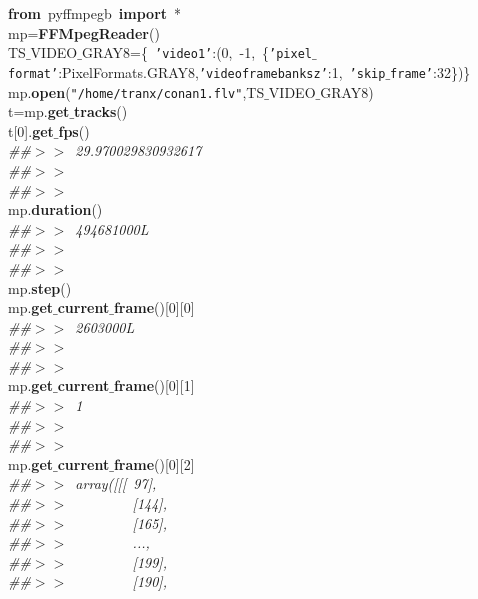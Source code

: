 \noindent
\mbox{}\textbf{from}\ pyffmpegb\ \textbf{import}\ * \\
\mbox{}mp=\textbf{FFMpegReader}() \\
\mbox{}TS$\_$VIDEO$\_$GRAY8=\{\ \texttt{'video1'}:(0,\ -1,\ \{\texttt{'pixel$\_$format'}:PixelFormats.GRAY8,\texttt{'videoframebanksz'}:1,\ \texttt{'skip$\_$frame'}:32\})\} \\
\mbox{}mp.\textbf{open}(\texttt{"{}/home/tranx/conan1.flv"{}},TS$\_$VIDEO$\_$GRAY8) \\
\mbox{}t=mp.\textbf{get$\_$tracks}() \\
\mbox{}t[0].\textbf{get$\_$fps}() \\
\mbox{}\textit{\#\#$>$$>$\ 29.970029830932617} \\
\mbox{}\textit{\#\#$>$$>$\ } \\
\mbox{}\textit{\#\#$>$$>$\ } \\
\mbox{}mp.\textbf{duration}() \\
\mbox{}\textit{\#\#$>$$>$\ 494681000L} \\
\mbox{}\textit{\#\#$>$$>$\ } \\
\mbox{}\textit{\#\#$>$$>$\ } \\
\mbox{}mp.\textbf{step}() \\
\mbox{}mp.\textbf{get$\_$current$\_$frame}()[0][0] \\
\mbox{}\textit{\#\#$>$$>$\ 2603000L} \\
\mbox{}\textit{\#\#$>$$>$\ } \\
\mbox{}\textit{\#\#$>$$>$\ } \\
\mbox{}mp.\textbf{get$\_$current$\_$frame}()[0][1] \\
\mbox{}\textit{\#\#$>$$>$\ 1} \\
\mbox{}\textit{\#\#$>$$>$\ } \\
\mbox{}\textit{\#\#$>$$>$\ } \\
\mbox{}mp.\textbf{get$\_$current$\_$frame}()[0][2] \\
\mbox{}\textit{\#\#$>$$>$\ array([[[\ 97],} \\
\mbox{}\textit{\#\#$>$$>$\ \ \ \ \ \ \ \ \ [144],} \\
\mbox{}\textit{\#\#$>$$>$\ \ \ \ \ \ \ \ \ [165],} \\
\mbox{}\textit{\#\#$>$$>$\ \ \ \ \ \ \ \ \ ...,\ } \\
\mbox{}\textit{\#\#$>$$>$\ \ \ \ \ \ \ \ \ [199],} \\
\mbox{}\textit{\#\#$>$$>$\ \ \ \ \ \ \ \ \ [190],} \\
